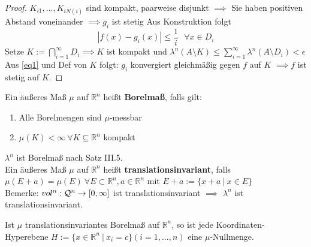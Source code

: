 \begin{proof}
    $K_{i1}, ...,K_{iN(i)}$ sind kompakt, paarweise disjunkt \newline 
    $\implies$ Sie haben positiven Abstand voneinander \newline
    $\implies g_i$ ist stetig \newline
    Aus Konstruktion folgt \begin{equation}
    |f(x) - g_i(x)| \leq \frac{1}{i} \text{ } \forall x\in D_i
    \label{eq1}
    \end{equation}
    Setze $K:= \bigcap\limits_{i=1}^{\infty} D_i \implies K$ ist kompakt und $\lambda^n(A\setminus K) \leq \sum\limits_{i=1}^{\infty}\lambda^n(A\setminus D_i) < \epsilon$ \newline
    Aus \ref{eq1} und Def von $K$ folgt: $g_i$ konvergiert gleichmäßig gegen $f$ auf $K$ $\implies f$ ist stetig auf $K$. 
    \end{proof}

    \newpage

    \begin{definition}
      Ein äußeres Maß $\mu$ auf $\mathbb{R}^n$ heißt \textbf{Borelmaß}, falls gilt:
      \begin{enumerate}
        \item Alle Borelmengen sind $\mu$-messbar
        \item $\mu(K)<\infty \ \forall K \subseteq \mathbb{R}^n$ kompakt
      \end{enumerate}
    \end{definition}

    \begin{remark}
      $\lambda^n$ ist Borelmaß nach Satz III.5.\\
      Ein äußeres Maß $\mu$ auf $\mathbb{R}^n$ heißt \textbf{translationsinvariant}, falls \\
      $\mu(E + a) = \mu(E) \ \forall E \subset \mathbb{R}^n, a \in \mathbb{R}^n$ mit $E + a := \{x + a \ | \ x \in E\}$\\
      Bemerke: $vol^n:\mathcal{Q}^n \to [0, \infty]$ ist translationsinvariant $\implies$ $\lambda^n$ ist translationsinvariant.
    \end{remark}

    \begin{lemma}
      Ist $\mu$ translationsinvariantes Borelmaß auf $\mathbb{R}^n$, so ist jede Koordinaten-Hyperebene $H := \{x \in \mathbb{R}^n \ | \ x_i = c\} (i=1,...,n)$ eine $\mu$-Nullmenge.
    \end{lemma}

